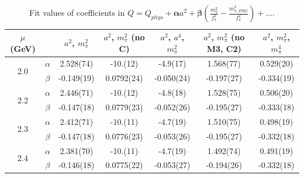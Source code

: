 \documentclass[12pt]{extarticle}
\begin{document}
\begin{table}[h!]
\begin{center}
\begin{tabular}{|c c|c|c|c|c|c|}
\hline
$\mu$ (GeV) &  & $a^2$, $m_\pi^2$& $a^2$, $m_\pi^2$ (no C)& $a^2$, $a^4$, $m_\pi^2$& $a^2$, $m_\pi^2$ (no M3, C2)& $a^2$, $m_\pi^2$, $m_\pi^4$\\
\hline
\multirow{2}{0.5in}{2.0} & $\alpha$ & 2.528(74)& -10.(12)& -4.9(17)& 1.568(77)& 0.529(20)\\
 & $\beta$ & -0.149(19)& 0.0792(24)& -0.050(24)& -0.197(27)& -0.334(19)\\
\hline
\multirow{2}{0.5in}{2.2} & $\alpha$ & 2.446(71)& -10.(12)& -4.8(18)& 1.528(75)& 0.506(20)\\
 & $\beta$ & -0.147(18)& 0.0779(23)& -0.052(26)& -0.195(27)& -0.333(18)\\
\hline
\multirow{2}{0.5in}{2.3} & $\alpha$ & 2.412(71)& -10.(11)& -4.7(19)& 1.510(75)& 0.498(19)\\
 & $\beta$ & -0.147(18)& 0.0776(23)& -0.053(26)& -0.195(27)& -0.332(18)\\
\hline
\multirow{2}{0.5in}{2.4} & $\alpha$ & 2.381(70)& -10.(11)& -4.7(19)& 1.492(74)& 0.491(19)\\
 & $\beta$ & -0.146(18)& 0.0775(22)& -0.053(27)& -0.194(26)& -0.332(18)\\
\hline
\end{tabular}
\caption{Fit values of coefficients in $Q = Q_{phys} + \mathbf{\alpha} a^2 + \mathbf{\beta}\left(\frac{m_\pi^2}{f_\pi^2}-\frac{m_{\pi,PDG}^2}{f_\pi^2}\right) + \ldots$.}
\end{center}
\end{table}




















\clearpage
\end{document}

